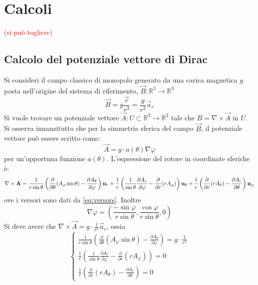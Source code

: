\section{Calcoli}
\textcolor{red}{(si può togliere)}
\subsection{Calcolo del potenziale vettore di Dirac}
\label{sec:dirac_potential}
Si consideri il campo classico di monopolo generato da una carica magnetica $g$ posta
nell'origine del sistema di riferimento, $\vec B : \mathbb{R} ^3 \to \mathbb{R} ^3$
    $$ \vec B = g\frac{\vec r}{r^3} = \frac{g}{r^2} \vec u _r $$
Si vuole trovare un potenziale vettore $\vec A : U \subset \mathbb{R} ^3 \to \mathbb{R} ^3$ tale che
$ B = \nabla \times \vec A $ in $U$. Si osserva innanzitutto che per la simmetria
sferica del campo $\vec B$, il potenziale vettore può essere scritto come:
   $$ \vec A = g \cdot a(\theta) \nabla \varphi $$
per un'opportuna funzione $a(\theta)$.
L'espressione del rotore in coordinate sferiche è:
$$
    \nabla \times \vec A =
         \frac{1}{r\sin\theta} \left(
              \frac{\partial}{\partial\theta}(A_\varphi\sin\theta) -
              \frac{\partial A_\theta}{\partial\varphi}
              \right) \vec u _r \\
         + \frac{1}{r} \left(
              \frac{1}{\sin\theta}\frac{\partial A_r}{\partial\varphi} -
              \frac{\partial}{\partial r}(r A_\varphi)
              \right)\vec u _\theta \\
         + \frac{1}{r} \left(
              \frac{\partial}{\partial r}(r A_\theta) - \frac{\partial A_r}{\partial\theta}
              \right)\vec u _\varphi
$$
ove i versori sono dati da \ref{eq:versors}. Inoltre
$$
   \nabla \varphi = \left( \frac{-\sin\varphi}{r\sin\theta},\frac{\cos\varphi}{r\sin\theta},0 \right)
$$
Si deve avere che $ \nabla \times \vec A = g \cdot \frac{1}{r^2} \vec u _r$,
ossia
$$
\begin{cases}
    \frac{1}{r\sin\theta} \left(
         \frac{\partial}{\partial\theta}(A_\varphi\sin\theta) -
         \frac{\partial A_\theta}{\partial\varphi}
         \right) = g \cdot \frac{1}{r^2} \\
    \frac{1}{r} \left(
         \frac{1}{\sin\theta}\frac{\partial A_r}{\partial\varphi} -
         \frac{\partial}{\partial r}(r A_\varphi)
         \right) = 0 \\
    \frac{1}{r} \left(
         \frac{\partial}{\partial r}(r A_\theta) - \frac{\partial A_r}{\partial\theta}
         \right) = 0
\end{cases}
$$
